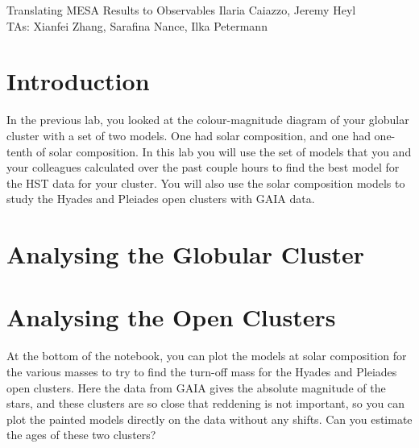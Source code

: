 \documentclass{article}
\begin{document}
\begin{titlebox}{Translating MESA Results to Observables}
Ilaria Caiazzo, Jeremy Heyl \\
TAs: Xianfei Zhang, Sarafina Nance, Ilka Petermann
\end{titlebox}

\section{Introduction}

In the previous lab, you looked at the colour-magnitude diagram of your globular cluster with a set of two models.  One had solar composition, and one had  one-tenth of solar composition.  In this lab you will use the set of models that you and your colleagues calculated over the past couple hours to find the best model for the HST data for your cluster.  You will also use the solar composition models to study the Hyades and Pleiades open clusters with GAIA data.

\section{Analysing the Globular Cluster}

\section{Analysing the Open Clusters}

At the bottom of the notebook, you can plot the models at solar composition for the various masses to try to find the turn-off mass for the Hyades and Pleiades open clusters.   Here the data from GAIA gives the absolute magnitude of the stars, and these clusters are so close that reddening is not important, so you can plot the painted models directly on the data without any shifts.   Can you estimate the ages of these two clusters?
\end{document}
